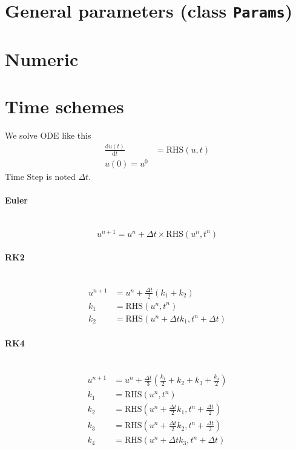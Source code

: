 \documentclass[12pt]{article}
\numberwithin{equation}{section}%
\begin{document}
\section{General parameters (class \texttt{Params})}
\section{Numeric}
\section{Time schemes}

We solve ODE like this
\begin{align}
	\frac{\mathrm{d}u(t)}{\mathrm{d}t} &= \mathrm{RHS}(u, t)\\
	u(0) = u^0
\end{align}
Time Step is noted $\Delta t$.
\paragraph{Euler}~\\
\begin{equation}
	u^{n+1} = u^n+\Delta t\times \mathrm{RHS}(u^n, t^n)
\end{equation}
\paragraph{RK2}~\\
\begin{align}
	u^{n+1} &= u^n+\frac{\Delta t}{2}(k_1+k_2)\\
	k_1 &= \mathrm{RHS}(u^n, t^n)\\
	k_2 &= \mathrm{RHS}(u^n +\Delta t k_1, t^n+\Delta t)
\end{align}
\paragraph{RK4}~\\
\begin{align}
	u^{n+1} &= u^n+\frac{\Delta t}{3}(\frac{k_1}{2}+k_2+k_3+\frac{k_4}{2})\\
	k_1 &= \mathrm{RHS}(u^n, t^n)\\
	k_2 &= \mathrm{RHS}(u^n +\frac{\Delta t}{2}k_1, t^n+\frac{\Delta t}{2})\\
	k_3 &= \mathrm{RHS}(u^n+\frac{\Delta t}{2}k_2, t^n+\frac{\Delta t}{2})\\
	k_4 &= \mathrm{RHS}(u^n+\Delta t k_3, t^n+\Delta t)
\end{align}
\end{document}
